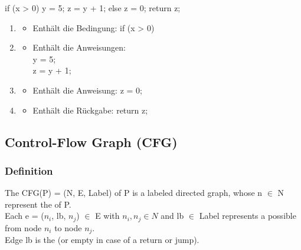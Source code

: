 \begin{infoBox}[title=Beispiel für Basic Blocks]
    \begin{codeBlock}{}
        if (x > 0) {
            y = 5;
            z = y + 1;
        } else {
            z = 0;
        }
        return z;
    \end{codeBlock}
    \begin{enumerate}
        \item {}
        \begin{itemize}
            \item Enthält die Bedingung: if (x > 0)
        \end{itemize}
        \item {}
        \begin{itemize}
            \item Enthält die Anweisungen:\\
            y = 5;\\
            z = y + 1;
        \end{itemize}
        \item {}
        \begin{itemize}
            \item Enthält die Anweisung: z = 0;
        \end{itemize}
        \item {}
        \begin{itemize}
            \item Enthält die Rückgabe: return z;
        \end{itemize}
    \end{enumerate}
\end{infoBox}

\subsection{Control-Flow Graph (CFG)}
\subsubsection*{Definition}
\begin{defBox}[title=Control-Flow Graph]
    The  CFG(P) = (N, E, Label) of P is a labeled directed graph, whose  n $\in$ N represent the  of P.\\
    Each  e = ($n_{i}$, lb, $n_{j}$) $\in$ E with $n_{i}, n_{j} \in N$ and lb $\in$ Label represents a possible  from node $n_{i}$ to node $n_{j}$.\\
    Edge  lb is the  (or empty in case of a return or jump).
\end{defBox}
\clearpage
